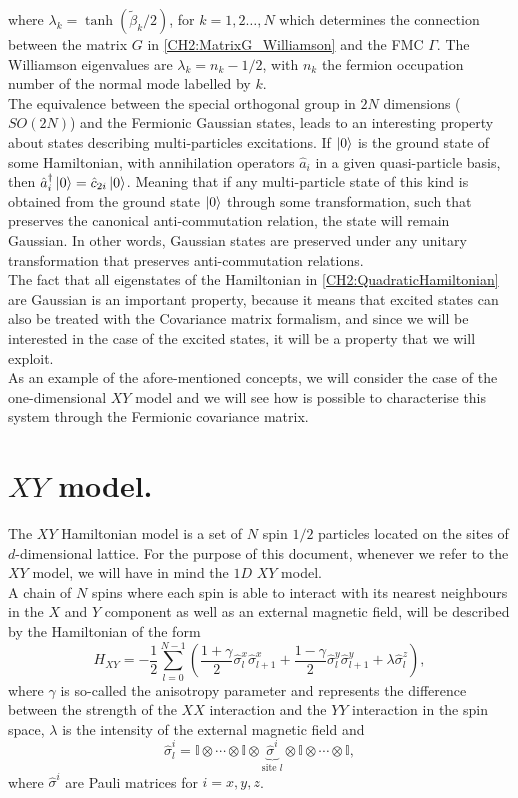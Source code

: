 where $\lambda_k = \operatorname{tanh}(\tilde{\beta}_k/2)$, for $k=1,2\ldots,N$ \cite{kraus_pairing_2009} which determines the connection between the matrix $G$ in \eqref{CH2:MatrixG_Williamson} and the FMC $\Gamma$. The Williamson eigenvalues are $\lambda_k=n_k -1/2$, with $n_k$ the fermion occupation number of the normal mode labelled by $k$. \\
\indent The equivalence between the special orthogonal group in $2N$ dimensions ($SO(2N)$) and the Fermionic Gaussian states, leads to an interesting  property about states describing multi-particles excitations. If $\mathinner{|{0}\rangle}$ is the ground state of some Hamiltonian, with annihilation operators $\hat{a}_{i}$ in a given quasi-particle basis, then $\hat{a}_{i}^{\dagger}\mathinner{|{0}\rangle} = \hat{c}_{2i}\mathinner{|{0}\rangle}$. Meaning that if any multi-particle state of this kind is obtained from the ground state $\mathinner{|{0}\rangle}$ through some transformation, such that preserves the canonical anti-commutation relation, the state will remain Gaussian. In other words, Gaussian states are preserved under any unitary transformation that preserves anti-commutation relations.\\
\indent The fact that all eigenstates of the Hamiltonian in \eqref{CH2:QuadraticHamiltonian} are Gaussian is an important property, because it means that excited states can also be treated with the Covariance matrix formalism, and since we will be interested in the case of the excited states, it will be a property that we will exploit.\\
\indent As an example of the afore-mentioned concepts, we will consider the case of the one-dimensional $XY$ model and we will see how is possible to characterise this system through the Fermionic covariance matrix. 
\section{$XY$ model.}
The $XY$ Hamiltonian model is a set of $N$ spin $1/2$ particles located on the sites of $d$-dimensional lattice. For the purpose of this document, whenever we refer to the $XY$ model, we will have in mind the $1D$ $XY$ model.\\
\indent A chain of $N$ spins where each spin is able to interact with its nearest neighbours in the $X$ and $Y$ component as well as an external magnetic field, will be described by the Hamiltonian of the form
\begin{equation}
H_{XY}=-\frac{1}{2} \sum_{l=0}^{N-1}\left(\frac{1+\gamma}{2} \hat{\sigma}_{l}^{x} \hat{\sigma}_{l+1}^{x}+\frac{1-\gamma}{2} \hat{\sigma}_{l}^{y} \hat{\sigma}_{l+1}^{y}+\lambda \hat{\sigma}_{l}^{z}\right),
\label{CH3:Hamiltonian_XY}
\end{equation}
where $\gamma$ is so-called the anisotropy parameter and represents the difference between the strength of the $XX$ interaction and the $YY$ interaction in the spin space, $\lambda$ is the intensity of the external magnetic field and
\begin{equation}
\hat{\sigma}^{i}_{l} = \mathbb{I}\otimes\cdots \otimes\mathbb{I}\otimes\underbrace{\hat{\sigma}^{i}}_{\text{site } l}\otimes\mathbb{I}\otimes\cdots\otimes\mathbb{I},
\end{equation}
where $\hat{\sigma}^{i}$ are Pauli matrices for $i=x, y, z$.
